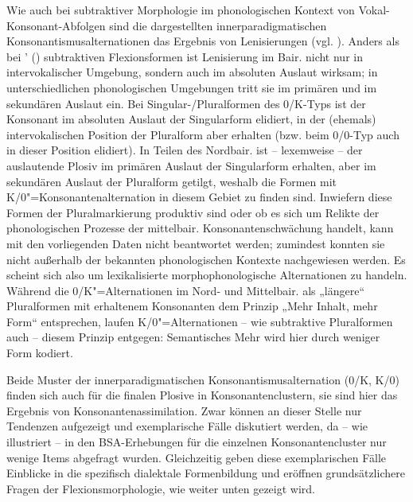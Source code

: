 Wie auch bei subtraktiver Morphologie im phonologischen Kontext von Vokal-Konsonant-Abfolgen sind die dargestellten innerparadigmatischen Konsonantismusalternationen das Ergebnis von Lenisierungen (vgl. \citealt[82]{Birkenes2014}). Anders als bei \citeauthor{Birkenes2014}' (\citeyear{Birkenes2014}) subtraktiven Flexionsformen ist Lenisierung im Bair. nicht nur in intervokalischer Umgebung, sondern auch im absoluten Auslaut wirksam; in unterschiedlichen phonologischen Umgebungen tritt sie im primären und im sekundären Auslaut ein. Bei Singular-/Pluralformen des 0/K-Typs ist der Konsonant im absoluten Auslaut der Singularform elidiert, in der (ehemals) intervokalischen Position der Pluralform aber erhalten (bzw. beim 0/0-Typ auch in dieser Position elidiert). In Teilen des Nordbair. ist -- lexemweise -- der auslautende Plosiv im primären Auslaut der Singularform erhalten, aber im sekundären Auslaut der Pluralform getilgt, weshalb die Formen mit K/0"=Konsonantenalternation in diesem Gebiet zu finden sind. Inwiefern diese Formen der Pluralmarkierung produktiv sind oder ob es sich um Relikte der phonologischen Prozesse der mittelbair. Konsonantenschwächung handelt, kann mit den vorliegenden Daten nicht beantwortet werden; zumindest konnten sie nicht außerhalb der bekannten phonologischen Kontexte nachgewiesen werden. Es scheint sich also um lexikalisierte morphophonologische Alternationen zu handeln. Während die 0/K"=Alternationen im Nord- und Mittelbair. als „längere“ Pluralformen mit erhaltenem Konsonanten dem Prinzip „Mehr Inhalt, mehr Form“ entsprechen, laufen K/0"=Alternationen -- wie subtraktive Pluralformen auch -- diesem Prinzip entgegen: Semantisches Mehr wird hier durch weniger Form kodiert.

\largerpage[-1]

Beide Muster der innerparadigmatischen Konsonantismusalternation (0/K, K/0) finden sich auch für die finalen Plosive in Konsonantenclustern, sie sind hier das Ergebnis von Konsonantenassimilation. Zwar können an dieser Stelle nur Tendenzen aufgezeigt und exemplarische Fälle diskutiert werden, da -- wie  illustriert -- in den BSA-Erhebungen für die einzelnen Konsonantencluster nur wenige Items abgefragt wurden. Gleichzeitig geben diese exemplarischen Fälle Einblicke in die spezifisch dialektale Formenbildung und eröffnen grundsätzlichere Fragen der Flexionsmorphologie, wie weiter unten gezeigt wird.

